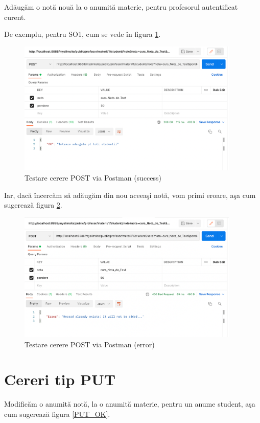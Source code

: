 \documentclass{report}
\begin{document}
Adăugăm o notă nouă la o anumită materie, pentru profesorul autentificat curent.

De exemplu, pentru SO1, cum se vede în figura \ref{POST_OK}.

\begin{figure}[h!]
    \centering
    \includegraphics[width=300pt]{img/POST_OK.png}
    \caption{Testare cerere POST via Postman (success)}
    \label{POST_OK}
\end{figure}


Iar, dacă încercăm să adăugăm din nou aceea\c si notă, vom primi eroare, a\c sa cum sugerează figura \ref{POST_ERR}.

\begin{figure}[h!]
    \centering
    \includegraphics[width=300pt]{img/POST_ERR.png}
    \caption{Testare cerere POST via Postman (error)}
    \label{POST_ERR}
\end{figure}
\section{Cereri tip PUT}

Modificăm o anumită notă, la o anumită materie, pentru un anume student, a\c sa cum sugerează figura \ref{PUT_OK}.
\end{document}
